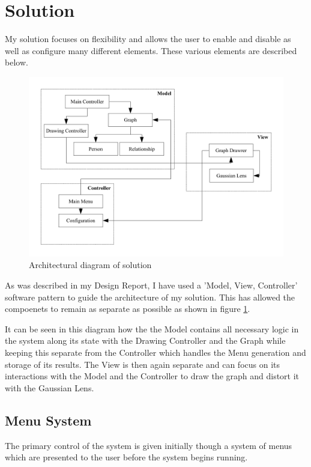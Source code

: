 \documentclass[12pt,a4paper]{article}
\begin{document}
\section{Solution}

My solution focuses on flexibility and allows the user to enable and disable as well as configure many different elements. These various elements are described below.

\begin{figure}[htb]
\centering
\caption{Architectural diagram of solution}
\label{fig:diagram}
\includegraphics[scale=0.75]{ArchitectureDiagram.pdf}
\end{figure}

As was described in my Design Report, I have used a 'Model, View, Controller' software pattern to guide the architecture of my solution. This has allowed the compoenets to remain as separate as possible as shown in figure \ref{fig:diagram}.

It can be seen in this diagram how the the Model contains all necessary logic in the system along its state with the Drawing Controller and the Graph while keeping this separate from the Controller which handles the Menu generation and storage of its results. The View is then again separate and can focus on its interactions with the Model and the Controller to draw the graph and distort it with the Gaussian Lens.

\subsection{Menu System}

The primary control of the system is given initially though a system of menus which are presented to the user before the system begins running.
\end{document}
